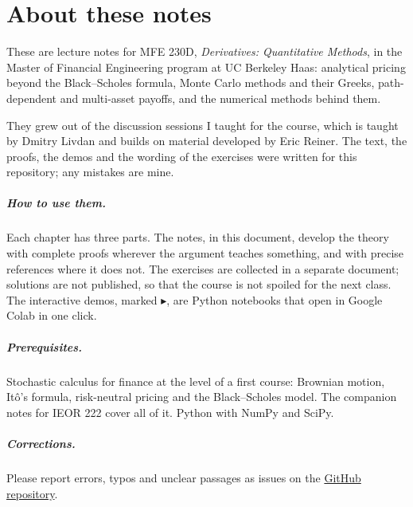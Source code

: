 \chapter*{About these notes}

These are lecture notes for MFE 230D, \emph{Derivatives: Quantitative Methods}, in the
Master of Financial Engineering program at UC Berkeley Haas: analytical pricing beyond the
Black--Scholes formula, Monte Carlo methods and their Greeks, path-dependent and
multi-asset payoffs, and the numerical methods behind them.

They grew out of the discussion sessions I taught for the course, which is taught by
Dmitry Livdan and builds on material developed by Eric Reiner. The text, the proofs, the
demos and the wording of the exercises were written for this repository; any mistakes
are mine.

\paragraph{How to use them.} Each chapter has three parts. The notes, in this document,
develop the theory with complete proofs wherever the argument teaches something, and
with precise references where it does not. The exercises are collected in a separate
document; solutions are not published, so that the course is not spoiled for the next
class. The interactive demos, marked \textcolor{cobalt}{$\blacktriangleright$}, are Python
notebooks that open in Google Colab in one click.

\paragraph{Prerequisites.} Stochastic calculus for finance at the level of a first
course: Brownian motion, It\^o's formula, risk-neutral pricing and the Black--Scholes model.
The companion notes for IEOR 222 cover all of it. Python with NumPy and SciPy.

\paragraph{Corrections.} Please report errors, typos and unclear passages as issues on
the \href{\repourl/issues}{GitHub repository}.


